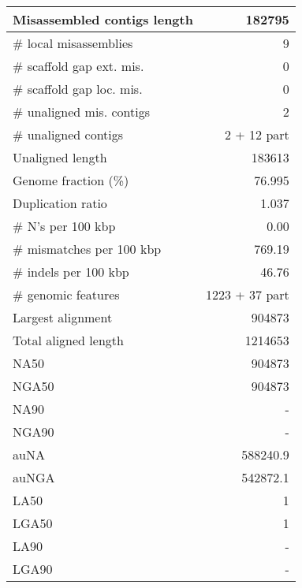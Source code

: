 \documentclass[12pt,a4paper]{article}
\begin{document}
\begin{table}[ht]
\begin{center}
\begin{tabular}{|l*{1}{|r}|}
Misassembled contigs length & 182795 \\ \hline
\# local misassemblies & 9 \\ \hline
\# scaffold gap ext. mis. & 0 \\ \hline
\# scaffold gap loc. mis. & 0 \\ \hline
\# unaligned mis. contigs & 2 \\ \hline
\# unaligned contigs & 2 + 12 part \\ \hline
Unaligned length & 183613 \\ \hline
Genome fraction (\%) & 76.995 \\ \hline
Duplication ratio & 1.037 \\ \hline
\# N's per 100 kbp & 0.00 \\ \hline
\# mismatches per 100 kbp & 769.19 \\ \hline
\# indels per 100 kbp & 46.76 \\ \hline
\# genomic features & 1223 + 37 part \\ \hline
Largest alignment & 904873 \\ \hline
Total aligned length & 1214653 \\ \hline
NA50 & 904873 \\ \hline
NGA50 & 904873 \\ \hline
NA90 & - \\ \hline
NGA90 & - \\ \hline
auNA & 588240.9 \\ \hline
auNGA & 542872.1 \\ \hline
LA50 & 1 \\ \hline
LGA50 & 1 \\ \hline
LA90 & - \\ \hline
LGA90 & - \\ \hline
\end{tabular}
\end{center}
\end{table}
\end{document}
